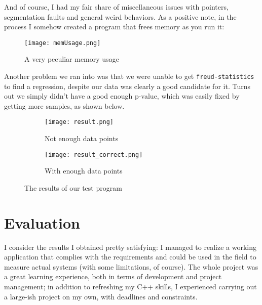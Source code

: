         And of course, I had my fair share of miscellaneous issues with pointers, segmentation faults and 
        general weird behaviors. As a positive note, in the process I somehow created a program that frees
        memory as you run it:

        \begin{figure}[H]
            \centering
            \texttt{[image: memUsage.png]}
            \caption{A very peculiar memory usage}
            \label{fig:memUsage}
        \end{figure}

        Another problem we ran into was that we were unable to get \texttt{freud-statistics} to find a
        regression, despite our data was clearly a good candidate for it. Turns out we simply didn't have a
        good enough p-value, which was easily fixed by getting more samples, as shown below.

        \begin{figure}[H]
            \centering
            \begin{subfigure}[b]{0.49\textwidth}
                \texttt{[image: result.png]}
                \caption{Not enough data points}
                \label{fig:result1}
            \end{subfigure}
            \hfill
            \begin{subfigure}[b]{0.49\textwidth}
                \texttt{[image: result\_correct.png]}
                \caption{With enough data points}
                \label{fig:result2}
            \end{subfigure}
            \caption{The results of our test program}
            \label{fig:fullresult}
        \end{figure}


\chapter{Evaluation}


    I consider the results I obtained pretty satisfying: I managed to realize a working application
    that complies with the requirements and could be used in the field to measure actual systems
    (with some limitations, of course). The whole project was a great learning experience, both
    in terms of development and project management; in addition to refreshing my C++ skills, I
    experienced carrying out a large-ish project on my own, with deadlines and constraints.\\

